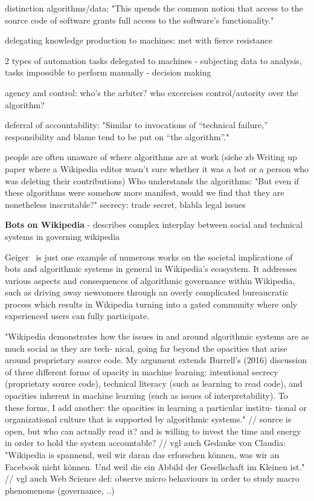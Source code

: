 \documentclass[pdftex,a4paper,11pt]{scrartcl}
\begin{document}
distinction algorithms/data:
"This upends the common notion that access to the source code of
software grants full access to the software’s functionality."

delegating knowledge production to machines: met with fierce resistance

2 types of automation tasks delegated to machines
- subjecting data to analysis, tasks impossible to perform manually
- decision making

agency and control: who's the arbiter? who excercises control/autority over the
algorithm?

deferral of accountability:
"Similar to invocations of
“technical failure,” responsibility and blame tend to be put on “the
algorithm”."

people are often unaware of where algorithms are at work (siehe zb Writing up
paper where a Wikipedia editor wasn't sure whether it was a bot or a person who
was deleting their contributions)
Who understands the algorithms:
"But even if these algorithms
were somehow more manifest, would we find that they are nonetheless
inscrutable?"
secrecy: trade secret, blabla
legal issues


\textbf{Bots on Wikipedia}
\cite{Geiger2017}
- describes complex interplay between social and technical systems in governing wikipedia

  Geiger~\cite{Geiger2017} is just one example of numerous works on the societal implications of bots and algorithmic systems in general in Wikipedia's ecosystem.
  It addresses various aspects and consequences of algorithmic governance within Wikipedia, such as driving away newcomers through an overly complicated bureaucratic process which results in Wikipedia turning into a gated community where only experienced users can fully participate.

"Wikipedia demonstrates how the issues in and around
algorithmic systems are as much social as they are tech-
nical, going far beyond the opacities that arise around
proprietary source code. My argument extends Burrell’s
(2016) discussion of three different forms of opacity in
machine learning: intentional secrecy (proprietary
source code), technical literacy (such as learning to
read code), and opacities inherent in machine learning
(such as issues of interpretability). To these forms, I add
another: the opacities in learning a particular institu-
tional or organizational culture that is supported by
algorithmic systems."
// source is open, but who can actually read it? and is willing to invest the time and energy in order to hold the system accountable?
// vgl auch Gedanke von Claudia: "Wikipedia is spannend, weil wir daran das erforschen können, was wir an Facebook nicht können. Und weil die ein Abbild der Gesellschaft im Kleinen ist."
// vgl auch Web Science def: observe micro behaviours in order to study macro phenomenons (governance, ..)
\end{document}
